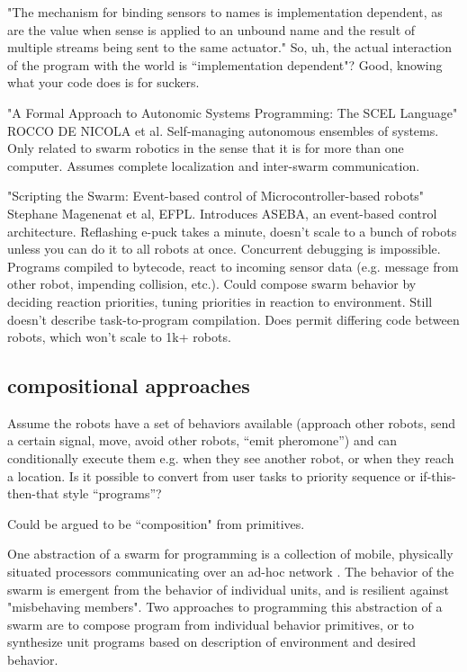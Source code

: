 \documentclass[]{article}
\begin{document}
"The mechanism for binding sensors to names is implementation dependent, as are the value when sense is applied to an unbound name and the result of multiple streams being sent to the same actuator." So, uh, the actual interaction of the program with the world is ``implementation dependent"? Good, knowing what your code does is for suckers. 

"A Formal Approach to Autonomic Systems Programming: The SCEL Language" \cite{nicola2014formal} ROCCO DE NICOLA et al. Self-managing autonomous ensembles of systems. Only related to swarm robotics in the sense that it is for more than one computer. Assumes complete localization and inter-swarm communication. 

"Scripting the Swarm: Event-based control of Microcontroller-based robots" \cite{magnenat2008scripting} Stephane Magenenat et al, EFPL. Introduces ASEBA, an event-based control architecture. Reflashing e-puck takes a minute, doesn't scale to a bunch of robots unless you can do it to all robots at once. Concurrent debugging is impossible. Programs compiled to bytecode, react to incoming sensor data (e.g. message from other robot, impending collision, etc.). Could compose swarm behavior by deciding reaction priorities, tuning priorities in reaction to environment. Still doesn't describe task-to-program compilation. Does permit differing code between robots, which won't scale to 1k+ robots.

\subsection{compositional approaches}

Assume the robots have a set of behaviors available (approach other robots, send a certain signal, move, avoid other robots, ``emit pheromone'') and can conditionally execute them e.g. when they see another robot, or when they reach a location. Is it possible to convert from user tasks to priority sequence or if-this-then-that style ``programs''?

Could be argued to be ``composition" from primitives.

One abstraction of a swarm for programming is a collection of mobile, physically situated processors communicating over an ad-hoc network \cite{evans2000programming}. The behavior of the swarm is emergent from the behavior of individual units, and is  resilient against "misbehaving members".
Two approaches to programming this abstraction of a swarm are to compose program from individual behavior primitives, or to synthesize unit programs based on description of environment and desired behavior. 
\end{document}
